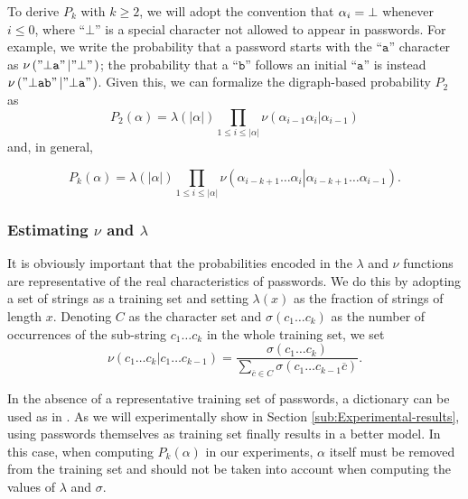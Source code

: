 \documentclass[a4paper,twocolumn]{article}
\begin{document}
To derive $P_{k}$ with $k\geq2$, we will adopt the convention that
$\alpha_{i}={\normalcolor \bot}$ whenever $i\leq0$, where {}``$\bot$''
is a special character not allowed to appear in passwords. For example,
we write the probability that a password starts with the {}``$\mathtt{a}$''
character as $\nu\left(\mathnormal{"\mathtt{\bot a}"}\left|\mathnormal{"\mathtt{\bot}"}\right.\right)$;
the probability that a {}``$\mathtt{b}$'' follows an initial {}``$\mathtt{a}$''
is instead $\nu\left(\mathnormal{"\mathtt{\bot ab}"}\left|\mathnormal{"\mathtt{\bot a}"}\right.\right)$.
Given this, we can formalize the digraph-based probability $P_{2}$
as \[
P_{2}\left(\alpha\right)=\lambda\left(\left|\alpha\right|\right)\prod_{1\leq i\leq\left|\alpha\right|}\nu\left(\alpha_{i-1}\alpha_{i}\left|\alpha_{i-1}\right.\right)\]
and, in general, 

\[
P_{k}\left(\alpha\right)=\lambda\left(\left|\alpha\right|\right)\prod_{1\leq i\leq\left|\alpha\right|}\nu\left(\alpha_{i-k+1}\ldots\alpha_{i}\left|\alpha_{i-k+1}\ldots\alpha_{i-1}\right.\right).\]



\subsubsection{Estimating $\nu$ and $\lambda$}

It is obviously important that the probabilities encoded in the $\lambda$
and $\nu$ functions are representative of the real characteristics
of passwords. We do this by adopting a set of strings as a training
set and setting $\lambda\left(x\right)$ as the fraction of strings
of length $x$. Denoting $C$ as the character set and $\sigma\left(c_{1}\ldots c_{k}\right)$
as the number of occurrences of the sub-string $c_{1}\ldots c_{k}$
in the whole training set, we set\[
\nu\left(c_{1}\ldots c_{k}\left|c_{1}\ldots c_{k-1}\right.\right)=\frac{\sigma\left(c_{1}\ldots c_{k}\right)}{\sum_{\overline{c}\in C}\sigma\left(c_{1}\ldots c_{k-1}\overline{c}\right)}.\]


In the absence of a representative training set of passwords, a dictionary
can be used as in \cite{Narayanan2005Fast}. As we will experimentally
show in Section \ref{sub:Experimental-results}, using passwords themselves
as training set finally results in a better model. In this case, when
computing $P_{k}\left(\alpha\right)$ in our experiments, $\alpha$
itself must be removed from the training set and should not be taken
into account when computing the values of $\lambda$ and $\sigma$.
\end{document}

